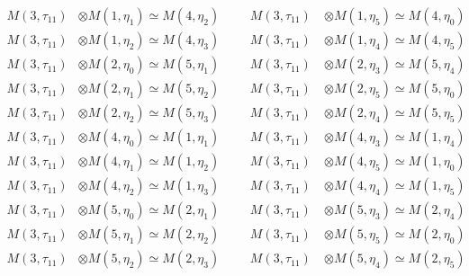 \begin{align*}
M(3,\tau_{11}) &\otimes M(1,\eta_{1}) \simeq M(4,\eta_{2}) &&& M(3,\tau_{11}) \
&\otimes M(1,\eta_{5}) \simeq M(4,\eta_{0})\\
M(3,\tau_{11}) &\otimes M(1,\eta_{2}) \simeq M(4,\eta_{3}) &&& M(3,\tau_{11}) \
&\otimes M(1,\eta_{4}) \simeq M(4,\eta_{5})\\
M(3,\tau_{11}) &\otimes M(2,\eta_{0}) \simeq M(5,\eta_{1}) &&& M(3,\tau_{11}) \
&\otimes M(2,\eta_{3}) \simeq M(5,\eta_{4})\\
M(3,\tau_{11}) &\otimes M(2,\eta_{1}) \simeq M(5,\eta_{2}) &&& M(3,\tau_{11}) \
&\otimes M(2,\eta_{5}) \simeq M(5,\eta_{0})\\
M(3,\tau_{11}) &\otimes M(2,\eta_{2}) \simeq M(5,\eta_{3}) &&& M(3,\tau_{11}) \
&\otimes M(2,\eta_{4}) \simeq M(5,\eta_{5})\\
M(3,\tau_{11}) &\otimes M(4,\eta_{0}) \simeq M(1,\eta_{1}) &&& M(3,\tau_{11}) \
&\otimes M(4,\eta_{3}) \simeq M(1,\eta_{4})\\
M(3,\tau_{11}) &\otimes M(4,\eta_{1}) \simeq M(1,\eta_{2}) &&& M(3,\tau_{11}) \
&\otimes M(4,\eta_{5}) \simeq M(1,\eta_{0})\\
M(3,\tau_{11}) &\otimes M(4,\eta_{2}) \simeq M(1,\eta_{3}) &&& M(3,\tau_{11}) \
&\otimes M(4,\eta_{4}) \simeq M(1,\eta_{5})\\
M(3,\tau_{11}) &\otimes M(5,\eta_{0}) \simeq M(2,\eta_{1}) &&& M(3,\tau_{11}) \
&\otimes M(5,\eta_{3}) \simeq M(2,\eta_{4})\\
M(3,\tau_{11}) &\otimes M(5,\eta_{1}) \simeq M(2,\eta_{2}) &&& M(3,\tau_{11}) \
&\otimes M(5,\eta_{5}) \simeq M(2,\eta_{0})\\
M(3,\tau_{11}) &\otimes M(5,\eta_{2}) \simeq M(2,\eta_{3}) &&& M(3,\tau_{11}) \
&\otimes M(5,\eta_{4}) \simeq M(2,\eta_{5})\\
\end{align*}

